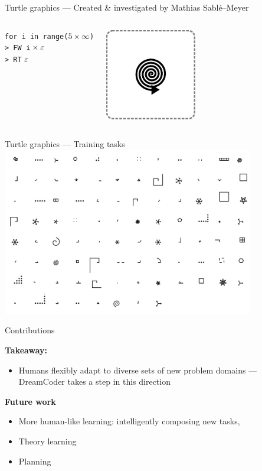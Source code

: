 \documentclass{beamer}
\begin{document}
\begin{frame}{Turtle graphics --- \small{Created \& investigated by Mathias
  Sablé--Meyer}}
{\begin{columns}[T]
        \begin{mycode}
          \texttt{for i in range($5\times\infty$)}\\
          \texttt{> FW $\text{\texttt{i}}\times\varepsilon$}\\
          \texttt{> RT} $\varepsilon$\\
          \vspace*{3\baselineskip}
        \end{mycode}
        \includegraphics[width = 4cm]{figures/teachLogo/sspiral.eps}
    \end{columns}
  }
\end{frame}

\begin{frame}{Turtle graphics --- Training tasks}
  \centering
  \includegraphics[width=11cm]{figures/tasksMinusBehaviour.png}
\end{frame}

\begin{frame}{Contributions}

  \textbf{Takeaway:}
  \begin{itemize}
    \item Humans flexibly adapt to diverse sets of new problem domains --- DreamCoder takes a step in this direction
  \end{itemize}
  \pause

  \textbf{Future work}

  \begin{itemize}
  \item More human-like learning: intelligently composing new tasks, 
    \pause
  \item Theory learning
    \item Planning
    \end{itemize}

  \end{frame}
\end{document}
